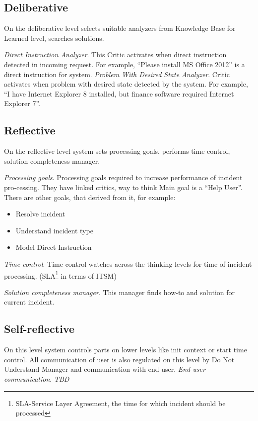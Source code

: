 \documentclass[12pt]{article}
\begin{document}
\subsection{Deliberative}

On the deliberative level selects suitable analyzers from Knowledge Base for Learned level, searches solutions.

\emph{Direct Instruction Analyzer}. This Critic activates when direct instruction detected in incoming request. For example, “Please install MS Office 2012” is a direct instruction for system.
\emph{Problem With Desired State Analyzer}. Critic activates when problem with desired state detected by the system. For example, “I have Internet Explorer 8 installed, but finance software required Internet Explorer 7”.

\subsection{Reflective}

On the reflective level system sets processing goals, performs time control, solution completeness manager.

\emph{Processing goals}. Processing goals required to increase performance of incident pro-cessing. They have linked critics, way to think Main goal is a “Help User”. There are other goals, that derived from it, for example:
\begin{itemize}
 \item Resolve incident
 \item Understand incident type
 \item Model Direct Instruction
\end{itemize}

\emph{Time control}. Time control watches across the thinking levels for time of incident processing. (SLA\footnote{SLA-Service Layer Agreement, the time for which incident should be processed} in terms of ITSM)

\emph{Solution completeness manager}. This manager finds how-to and solution for current incident.

\subsection{Self-reflective}
On this level system controls parts on lower levels like init context or start time control. All communication of user is also regulated on this level by Do Not Understand Manager and communication with end user.
\emph{End user communication}. \emph{TBD}
\end{document}
